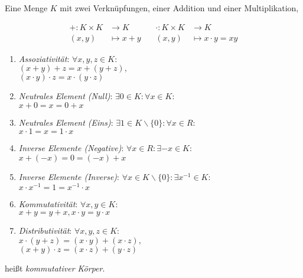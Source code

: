 Eine Menge $K$ mit zwei Verknüpfungen, einer Addition und einer Multiplikation,

\begin{align*}
+ : K \times K & \longrightarrow K \hspace{1cm} &
\cdot : K \times K & \longrightarrow K
\\
(x, y) & \longmapsto x + y &
(x, y) & \longmapsto x \cdot y = xy
\end{align*}

\begin{enumerate}[label=(K\arabic*)]

\item \textit{Assoziativität}: $\forall x, y, z \in K :$\\$(x+y)+z = x+(y+z),$\\$(x \cdot y) \cdot z = x \cdot (y \cdot z)$

\item \textit{Neutrales Element (Null)}: $\exists 0 \in K : \forall x \in K :$\\$x+0=x=0+x$

\item \textit{Neutrales Element (Eins)}: $\exists 1 \in K \backslash \{0\} : \forall x \in R :$\\$x \cdot 1=x=1 \cdot x$

\item \textit{Inverse Elemente (Negative)}: $\forall x \in R : \exists -x \in K :$\\$x + (-x) = 0 = (-x) + x$

\item \textit{Inverse Elemente (Inverse)}: $\forall x \in K \backslash \{0\} : \exists x^{-1} \in K :$\\$x \cdot x^{-1} = 1 = x^{-1} \cdot x$

\item \textit{Kommutativität}: $\forall x, y \in K :$\\$x+y=y+x, x \cdot y = y \cdot x$

\item \textit{Distributivität}: $\forall x, y, z \in K :$\\$x \cdot (y+z) = (x \cdot y) + (x \cdot z),$\\$(x+y) \cdot z = (x \cdot z) + (y \cdot z)$

\end{enumerate}

heißt \textit{kommutativer Körper}.